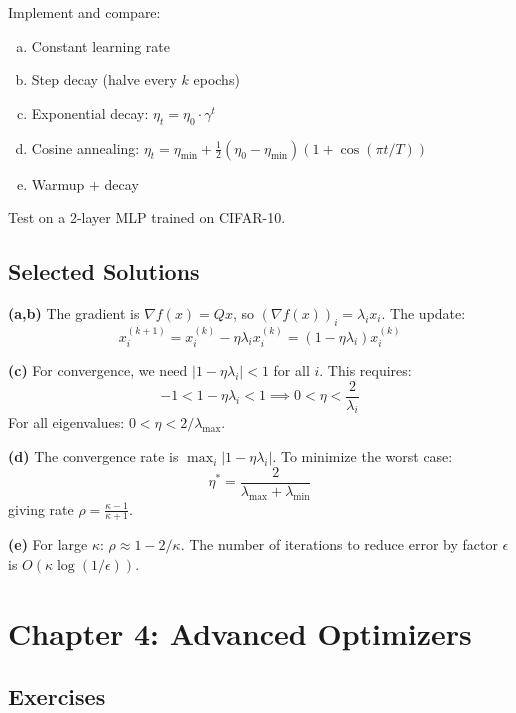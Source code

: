 \documentclass[../main.tex]{subfiles}
\begin{document}
\begin{simpleexercise}
Implement and compare:
\begin{enumerate}[(a)]
    \item Constant learning rate
    \item Step decay (halve every $k$ epochs)
    \item Exponential decay: $\eta_t = \eta_0 \cdot \gamma^t$
    \item Cosine annealing: $\eta_t = \eta_{\min} + \frac{1}{2}(\eta_0 - \eta_{\min})(1 + \cos(\pi t/T))$
    \item Warmup + decay
\end{enumerate}
Test on a 2-layer MLP trained on CIFAR-10.
\end{simpleexercise}

\subsection{Selected Solutions}

\begin{solution}[Exercise 3.1]
\textbf{(a,b)} The gradient is $\nabla f(x) = Qx$, so $(\nabla f(x))_i = \lambda_i x_i$. The update:
\[
x_i^{(k+1)} = x_i^{(k)} - \eta \lambda_i x_i^{(k)} = (1 - \eta\lambda_i)x_i^{(k)}
\]

\textbf{(c)} For convergence, we need $|1 - \eta\lambda_i| < 1$ for all $i$. This requires:
\[
-1 < 1 - \eta\lambda_i < 1 \implies 0 < \eta < \frac{2}{\lambda_i}
\]
For all eigenvalues: $0 < \eta < 2/\lambda_{\max}$.

\textbf{(d)} The convergence rate is $\max_i |1 - \eta\lambda_i|$. To minimize the worst case:
\[
\eta^* = \frac{2}{\lambda_{\max} + \lambda_{\min}}
\]
giving rate $\rho = \frac{\kappa - 1}{\kappa + 1}$.

\textbf{(e)} For large $\kappa$: $\rho \approx 1 - 2/\kappa$. The number of iterations to reduce error by factor $\epsilon$ is $O(\kappa \log(1/\epsilon))$.
\end{solution}

\section{Chapter 4: Advanced Optimizers}\label{sec:ex-advanced}

\subsection{Exercises}
\end{document}
